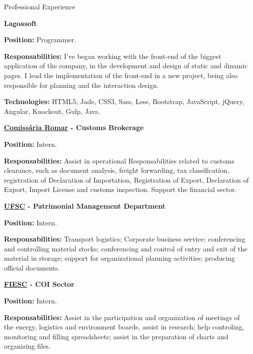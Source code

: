 \begin{rubric}{Professional Experience}{

  \entry*[2016 - Now]
  \textbf{Lagoasoft}

  \textbf{Position:} Programmer.

  \textbf{Responsabilities:} I've began working with the front-end of the biggest application of the company, in the development and design of    static and dinamic pages. I lead the implementation of the front-end in a new project, being also responsible for planning and the      interaction design.
   
  \textbf{Technologies:} HTML5, Jade, CSS3, Sass, Less, Bootstrap, JavaScript, jQuery, Angular,
  Knockout, Gulp, Java.

  \entry*[2014]
  \textbf{\href{http://www.comissariaromar.com.br/}{Comissária Romar}
    - Customs Brokerage}

  \textbf{Position:} Intern.

  \textbf{Responsabilities:} Assist in operational Responsabilities
   related to customs clearance, such as document analysis,
   freight forwarding, tax classification, registration of
   Declaration of Importation, Registration of Export, Declaration of
   Export, Import License and customs inspection. Support the
   financial sector.

  \entry*[2013 - 2014]
  \textbf{\href{http://www.ufsc.br/}{UFSC} - Patrimonial Management
    Department}

  \textbf{Position:} Intern.

  \textbf{Responsabilities:} Transport logistics; Corporate business
   service; conferencing and controlling material stocks;
   conferencing and control of entry and exit of the material in storage;
   support for organizational planning activities; producing
   official documents.


  \entry*[2012 - 2013]
  \textbf{\href{http://www.fiesc.com.br/}{FIESC} - COI Sector}

  \textbf{Position:} Intern.

  \textbf{Responsabilities:} Assist in the participation and organization of
   meetings of the energy, logistics and environment boards, assist
   in research; help controling, monitoring and filling
   spreadsheets; assist in the preparation of charts and organizing
   files.

}\end{rubric}
